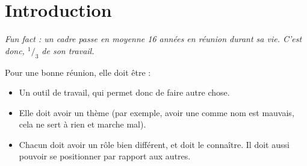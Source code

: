 \section{Introduction}
\emph{Fun fact : un cadre passe en moyenne 16 années en réunion durant sa vie. C'est donc, $ ^1/_3 $ de son travail.\\}

Pour une bonne réunion, elle doit être :
\begin{itemize}
    \item Un outil de travail, qui permet donc de faire autre chose.
    \item Elle doit avoir un thème (par exemple, avoir une comme nom  est mauvais, cela ne sert à rien et marche mal).
    \item Chacun doit avoir un rôle bien différent, et doit le connaître. Il doit aussi pouvoir se positionner par rapport aux autres.
\end{itemize}

